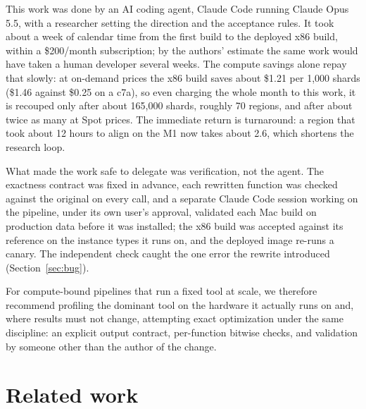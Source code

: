 \documentclass[11pt]{article}
\begin{document}
This work was done by an AI coding agent, Claude Code running Claude Opus 5.5, with a
researcher setting the direction and the acceptance rules. It took about a week of calendar
time from the first build to the deployed x86 build, within a \$200/month subscription; by the
authors' estimate the same work would have taken a human developer several weeks. The
compute savings alone repay that slowly: at on-demand prices the x86 build saves about \$1.21
per 1{,}000 shards (\$1.46 against \$0.25 on a c7a), so even charging the whole month to this
work, it is recouped only after about 165{,}000 shards, roughly 70 regions, and after about
twice as many at Spot prices. The immediate return is turnaround: a region that took about 12 hours
to align on the M1 now takes about 2.6, which shortens the research loop.

What made the work safe to delegate was verification, not the agent. The exactness contract
was fixed in advance, each rewritten function was checked against the original on every call,
and a separate Claude Code session working on the pipeline, under its own user's approval,
validated each Mac build on production data before it was installed; the x86 build was
accepted against its reference on the instance types it runs on, and the deployed image
re-runs a canary. The independent check caught the one error the rewrite introduced
(Section~\ref{sec:bug}).

For compute-bound pipelines that run a fixed tool at scale, we therefore recommend profiling
the dominant tool on the hardware it actually runs on and, where results must not change,
attempting exact optimization under the same discipline: an explicit output contract,
per-function bitwise checks, and validation by someone other than the author of the change.

\section{Related work}
\end{document}
